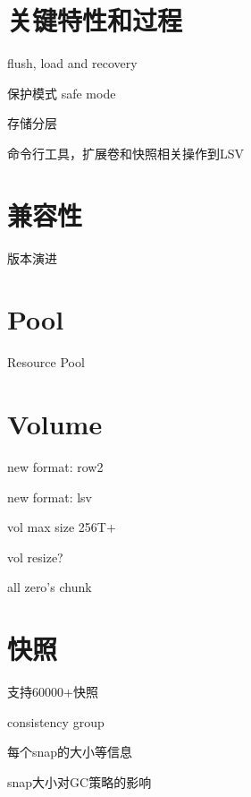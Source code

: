 \section{关键特性和过程}

\begin{compactenum}
    \item flush, load and recovery
    \item 保护模式 safe mode
    \item 存储分层
    \item 命令行工具，扩展卷和快照相关操作到LSV
\end{compactenum}

\section{兼容性}

\begin{compactenum}
    \item 版本演进
\end{compactenum}

\section{Pool}

\begin{compactenum}
    \item Resource Pool
\end{compactenum}

\section{Volume}

\begin{compactenum}
    \item new format: row2
    \item new format: lsv
    \item vol max size 256T+
    \item vol resize?
    \item all zero's chunk
\end{compactenum}

\section{快照}

\begin{compactenum}
    \item 支持60000+快照
    \item consistency group
    \item 每个snap的大小等信息
    \item snap大小对GC策略的影响
\end{compactenum}


